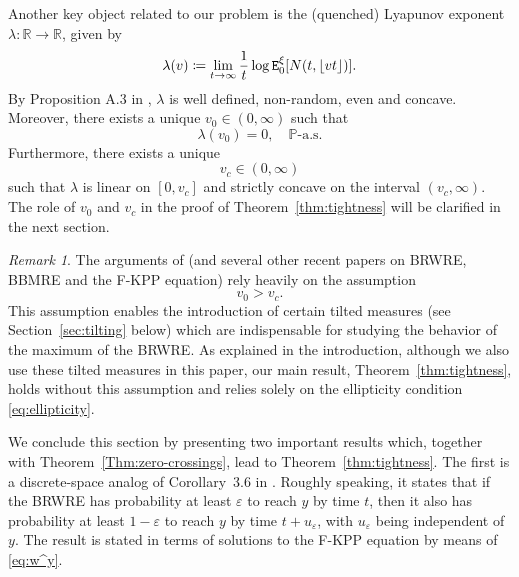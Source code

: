 \documentclass[12pt,reqno,oneside]{amsart}
\numberwithin{equation}{section}
\theoremstyle{definition}
\theoremstyle{remark}
\newtheorem{remark}[theorem]{Remark}
\newcommand{\R}{\mathbb{R}}
\newcommand{\PP}{\mathbb{P}}
\DeclarePairedDelimiter{\floor}{\lfloor}{\rfloor}
\begin{document}
Another key object related to our problem is the (quenched) Lyapunov exponent
$\lambda: \R \rightarrow \R$, given by
\begin{equation*}
  \lambda(v) \coloneq \lim_{t \rightarrow \infty}
  \frac{1}{t}\log \mathtt{E}_0^\xi[N(t,\floor{ vt })].
\end{equation*}
By Proposition A.3 in \cite{CD20}, $\lambda$ is well defined, non-random,
even and concave. Moreover, there exists a unique $v_0 \in (0,\infty)$ such that
\begin{equation*}
  \lambda(v_0)=0, \quad \PP\text{-a.s.}
\end{equation*}
Furthermore, there exists a unique
\begin{equation}\label{eq:def_v_c}
  v_c \in (0,\infty)
\end{equation}
such that $\lambda$ is linear on $[0,v_c]$ and strictly concave on the
interval $(v_c, \infty)$. The role of $v_0$ and $v_c$ in the proof of
Theorem~\ref{thm:tightness} will be clarified in the next section.

\begin{remark}
  \label{rk:v_0_vs_v_c}
  The arguments of \cite{CD20, Kri24} (and several other recent papers on
    BRWRE, BBMRE and the F-KPP equation) rely heavily on the assumption
  \begin{equation}
    \label{eqn:vo_vc}
    v_0 > v_c.
  \end{equation}
  This assumption enables the introduction of certain tilted measures (see
    Section~\ref{sec:tilting} below) which are indispensable for studying the
  behavior of the maximum of the BRWRE. As explained in the introduction,
  although we also use these tilted measures in this paper, our main result,
  Theorem~\ref{thm:tightness}, holds without this assumption and relies
  solely on the ellipticity condition \eqref{eq:ellipticity}.
\end{remark}

We conclude this section by presenting two important results which, together
with Theorem~\ref{Thm:zero-crossings}, lead to Theorem~\ref{thm:tightness}.
The first is a discrete-space analog of Corollary~3.6 in \cite{CDO25}.
Roughly speaking, it states that if the BRWRE has probability at least
$\varepsilon$ to reach $y$ by time $t$, then it also has probability at least
$1-\varepsilon$ to reach $y$ by time $t+u_\varepsilon$, with $u_\varepsilon$
being independent of $y$. The result is stated in terms of solutions to the
F-KPP equation by means of \eqref{eq:w^y}.
\end{document}
